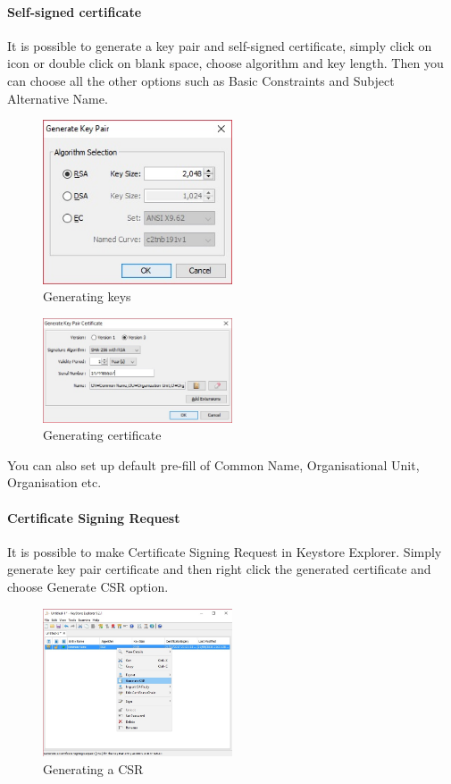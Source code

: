 \documentclass[10pt, a4paper]{report}
\begin{document}
      \paragraph{Self-signed certificate}
It is possible to generate a key pair and self-signed certificate, simply click on icon or double click on blank space, choose algorithm and key length. Then you can choose all the other options such as Basic Constraints and Subject Alternative Name.
\begin{figure}[!ht]
 \caption{Generating keys}
 \centering
  \includegraphics[width=0.5\textwidth]{../Dependancies/Keystore_Explorer/genKeys.jpg}
\end{figure}

\begin{figure}[!ht]
 \caption{Generating certificate}
 \centering
  \includegraphics[width=0.5\textwidth]{../Dependancies/Keystore_Explorer/genCert.jpg}
\end{figure}

You can also set up default pre-fill of Common Name, Organisational Unit, Organisation etc.

      \paragraph{Certificate Signing Request}
It is possible to make Certificate Signing Request in Keystore Explorer. Simply generate key pair certificate and then right click the generated certificate and choose Generate CSR option.
\begin{figure}[!ht]
 \caption{Generating a CSR}
 \centering
  \includegraphics[width=0.5\textwidth]{../Dependancies/Keystore_Explorer/genCSR.jpg}
\end{figure}
\end{document}
